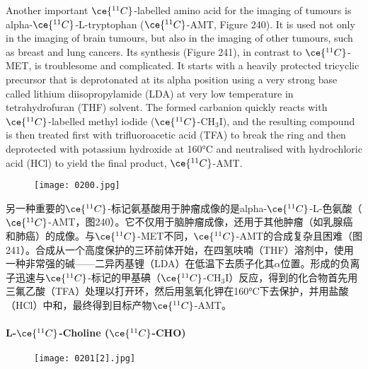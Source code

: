 \documentclass[dvipsnames, svgnames,a4paper,11pt]{article}
\begin{document}
Another important \(\ce{^{11}C}\)-labelled amino acid for the imaging of tumours is alpha-\(\ce{^{11}C}\)-L-tryptophan (\(\ce{^{11}C}\)-AMT, Figure 240). It is used not only in the imaging of brain tumours, but also in the imaging of other tumours, such as breast and lung cancers. Its synthesis (Figure 241), in contrast to \(\ce{^{11}C}\)-MET, is troublesome and complicated. It starts with a heavily protected tricyclic precursor that is deprotonated at its alpha position using a very strong base called lithium diisopropylamide (LDA) at very low temperature in tetrahydrofuran (THF) solvent. The formed carbanion quickly reacts with \(\ce{^{11}C}\)-labelled methyl iodide (\(\ce{^{11}C}\)-CH\(_3\)I), and the resulting compound is then treated first with trifluoroacetic acid (TFA) to break the ring and then deprotected with potassium hydroxide at 160°C and neutralised with hydrochloric acid (HCl) to yield the final product, \(\ce{^{11}C}\)-AMT.

\begin{figure}[h]
	\centering
    \texttt{[image: 0200.jpg]}  
     \label{fig241}
\end{figure}


另一种重要的\(\ce{^{11}C}\)-标记氨基酸用于肿瘤成像的是alpha-\(\ce{^{11}C}\)-L-色氨酸（\(\ce{^{11}C}\)-AMT，图240）。它不仅用于脑肿瘤成像，还用于其他肿瘤（如乳腺癌和肺癌）的成像。与\(\ce{^{11}C}\)-MET不同，\(\ce{^{11}C}\)-AMT的合成复杂且困难（图241）。合成从一个高度保护的三环前体开始，在四氢呋喃（THF）溶剂中，使用一种非常强的碱——二异丙基锂（LDA）在低温下去质子化其$\alpha$位置。形成的负离子迅速与\(\ce{^{11}C}\)-标记的甲基碘（\(\ce{^{11}C}\)-CH\(_3\)I）反应，得到的化合物首先用三氟乙酸（TFA）处理以打开环，然后用氢氧化钾在160°C下去保护，并用盐酸（HCl）中和，最终得到目标产物\(\ce{^{11}C}\)-AMT。


\paragraph{L-\(\ce{^{11}C}\)-Choline (\(\ce{^{11}C}\)-CHO) }  

\begin{wrapfigure}{r}{0.4\textwidth}
    \centering
    \texttt{[image: 0201[2].jpg]}
     \label{fig240}
\end{wrapfigure}
\end{document}
